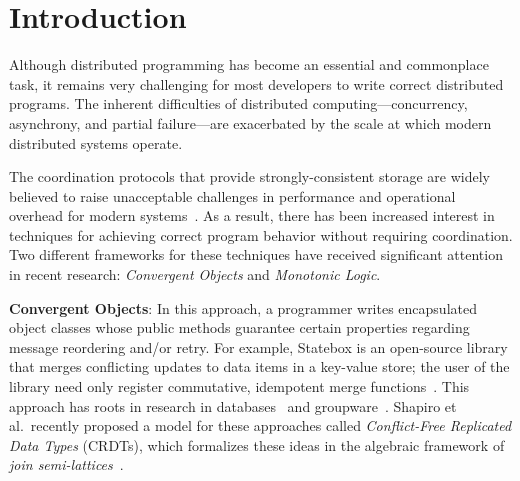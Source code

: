 \section{Introduction} 
\label{sec:intro} 
Although distributed programming has become an essential and commonplace task,
it remains very challenging for most developers to write correct distributed
programs. The inherent difficulties of distributed computing---concurrency,
asynchrony, and partial failure---are exacerbated by the scale at which modern
distributed systems operate.

The coordination protocols that provide strongly-consistent storage are widely believed to raise unacceptable challenges in performance and operational overhead for modern systems~\cite{Birman2009}. As a result, 
there has been increased interest in techniques for achieving correct program behavior without requiring coordination. 
Two different frameworks for these techniques have received significant attention in recent research:
\emph{Convergent Objects} and \emph{Monotonic Logic}.  

\vspace{0.5em}\noindent
\textbf{Convergent Objects}: In this approach, a programmer writes encapsulated
object classes whose public methods guarantee certain properties regarding
message reordering and/or retry. For example, Statebox is an open-source library
that merges conflicting updates to data items in a key-value store; the user of
the library need only register commutative, idempotent merge
functions~\cite{statebox}. This approach has roots in research in
databases~\cite{Farrag1989,Garcia-Molina1983,Helland2009} and
groupware~\cite{Ellis1989,Sun1998}.  Shapiro et al.\ recently proposed a model
for these approaches called \emph{Conflict-Free Replicated Data Types} (CRDTs),
which formalizes these ideas in the algebraic framework of {\em join semi-lattices}~\cite{Shapiro2011b}.

